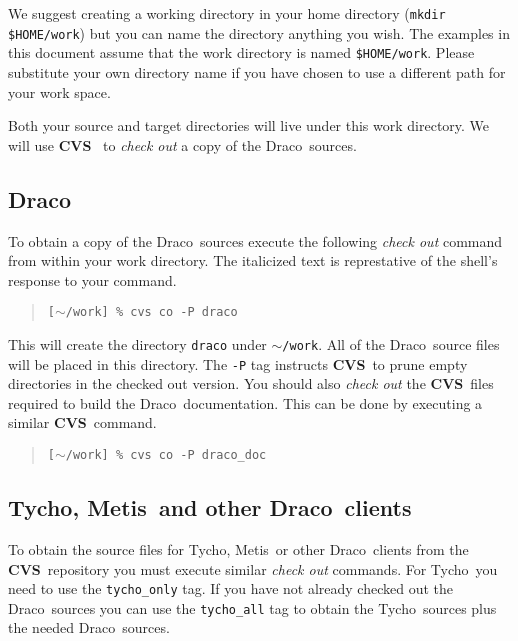 \documentclass[10pt]{nmemo}
\newcommand{\comp}[1]{\normalfont\normalsize\texttt{#1}}
\newcommand{\draco}{{\normalfont\sffamily Draco}}
\newcommand{\tycho}{{\normalfont\sffamily Tycho}}
\newcommand{\metis}{{\normalfont\sffamily Metis}}
\newcommand{\cvs}{{\normalfont\bfseries CVS}}
\begin{document}
We suggest creating a working directory in your home directory
(\comp{mkdir \${HOME}/work}) but you can name the directory anything
you wish.  The examples in this document assume that the work
directory is named \comp{\${HOME}/work}.  Please substitute your own
directory name if you have chosen to use a different path for your
work space.

Both your source and target directories will live under this work
directory.  We will use \cvs~\cite{cvs} to \emph{check out} a copy of
the \draco\ sources.  

\subsection{\draco}

To obtain a copy of the \draco\ sources execute the following
\emph{check out} command from within your work directory.  The
italicized text is represtative of the shell's response to your
command.

\footnotesize
\begin{verse}
\texttt{[$\sim$/work] \% cvs co -P draco} \\
\end{verse}
\normalsize

This will create the directory \comp{draco} under \comp{$\sim$/work}.  All
of the \draco\ source files will be placed in this directory.  The
\comp{-P} tag instructs \cvs\ to prune empty directories in the
checked out version.  You should also \emph{check out} the \cvs\ files 
required to build the \draco\ documentation.  This can be done by
executing a similar \cvs\ command.

\footnotesize
\begin{verse}
\texttt{[$\sim$/work] \% cvs co -P draco\_doc} \\
\end{verse}
\normalsize

\subsection{\tycho, \metis\ and other \draco\ clients}

To obtain the source files for \tycho, \metis\ or other \draco\ 
clients from the \cvs\ repository you must execute similar 
\emph{check out} commands.  For \tycho\ you need to use the
\comp{tycho\_only} tag.  If you have not already checked out the
\draco\ sources you can use the \comp{tycho\_all} tag to obtain the
\tycho\ sources plus the needed \draco\ sources.
\end{document}
